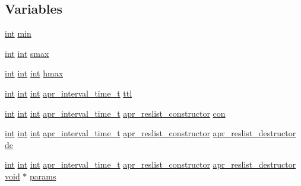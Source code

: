 \subsection*{Variables}
\begin{DoxyCompactItemize}
\item 
\hyperlink{pcre_8txt_a42dfa4ff673c82d8efe7144098fbc198}{int} \hyperlink{group__APR__Util__RL_ga3e202b201e6255d975cd6d3aff1f5a4d}{min}
\item 
\hyperlink{pcre_8txt_a42dfa4ff673c82d8efe7144098fbc198}{int} \hyperlink{pcre_8txt_a42dfa4ff673c82d8efe7144098fbc198}{int} \hyperlink{group__APR__Util__RL_ga889195693eba53a2638231e6c1f971b8}{smax}
\item 
\hyperlink{pcre_8txt_a42dfa4ff673c82d8efe7144098fbc198}{int} \hyperlink{pcre_8txt_a42dfa4ff673c82d8efe7144098fbc198}{int} \hyperlink{pcre_8txt_a42dfa4ff673c82d8efe7144098fbc198}{int} \hyperlink{group__APR__Util__RL_gae289b3d27f213c0c0525b41741ab8201}{hmax}
\item 
\hyperlink{pcre_8txt_a42dfa4ff673c82d8efe7144098fbc198}{int} \hyperlink{pcre_8txt_a42dfa4ff673c82d8efe7144098fbc198}{int} \hyperlink{pcre_8txt_a42dfa4ff673c82d8efe7144098fbc198}{int} \hyperlink{group__apr__time_gaae2129185a395cc393f76fabf4f43e47}{apr\+\_\+interval\+\_\+time\+\_\+t} \hyperlink{group__APR__Util__RL_ga9fabdc962650d25f74b7cfa14d4d60e7}{ttl}
\item 
\hyperlink{pcre_8txt_a42dfa4ff673c82d8efe7144098fbc198}{int} \hyperlink{pcre_8txt_a42dfa4ff673c82d8efe7144098fbc198}{int} \hyperlink{pcre_8txt_a42dfa4ff673c82d8efe7144098fbc198}{int} \hyperlink{group__apr__time_gaae2129185a395cc393f76fabf4f43e47}{apr\+\_\+interval\+\_\+time\+\_\+t} \hyperlink{group__APR__Util__RL_ga57065208a6925b61f5ca96ade452a3d6}{apr\+\_\+reslist\+\_\+constructor} \hyperlink{group__APR__Util__RL_ga78a9bc213e38a23acef3b56261062e3a}{con}
\item 
\hyperlink{pcre_8txt_a42dfa4ff673c82d8efe7144098fbc198}{int} \hyperlink{pcre_8txt_a42dfa4ff673c82d8efe7144098fbc198}{int} \hyperlink{pcre_8txt_a42dfa4ff673c82d8efe7144098fbc198}{int} \hyperlink{group__apr__time_gaae2129185a395cc393f76fabf4f43e47}{apr\+\_\+interval\+\_\+time\+\_\+t} \hyperlink{group__APR__Util__RL_ga57065208a6925b61f5ca96ade452a3d6}{apr\+\_\+reslist\+\_\+constructor} \hyperlink{group__APR__Util__RL_gab642eccd03379810b6beb1e7bf009dad}{apr\+\_\+reslist\+\_\+destructor} \hyperlink{group__APR__Util__RL_gab07bdd2ad15e8bf3e26dd0ca7a09c2b9}{de}
\item 
\hyperlink{pcre_8txt_a42dfa4ff673c82d8efe7144098fbc198}{int} \hyperlink{pcre_8txt_a42dfa4ff673c82d8efe7144098fbc198}{int} \hyperlink{pcre_8txt_a42dfa4ff673c82d8efe7144098fbc198}{int} \hyperlink{group__apr__time_gaae2129185a395cc393f76fabf4f43e47}{apr\+\_\+interval\+\_\+time\+\_\+t} \hyperlink{group__APR__Util__RL_ga57065208a6925b61f5ca96ade452a3d6}{apr\+\_\+reslist\+\_\+constructor} \hyperlink{group__APR__Util__RL_gab642eccd03379810b6beb1e7bf009dad}{apr\+\_\+reslist\+\_\+destructor} \hyperlink{group__MOD__ISAPI_gacd6cdbf73df3d9eed42fa493d9b621a6}{void} $\ast$ \hyperlink{group__APR__Util__RL_ga1d35e736cdbc73587323e02e92a68713}{params}

\end{DoxyCompactItemize}
